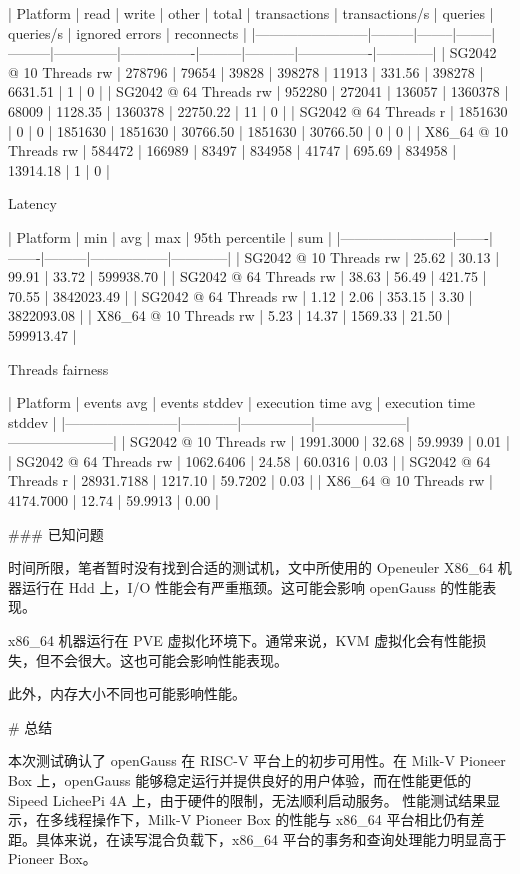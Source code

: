 \documentclass{article}
\begin{document}
\begin{markdown}
| Platform               | read    | write  | other  | total   | transactions | transactions/s | queries | queries/s | ignored errors | reconnects |
|------------------------|---------|--------|--------|---------|--------------|----------------|---------|-----------|----------------|------------|
| SG2042 @ 10 Threads rw | 278796  | 79654  | 39828  | 398278  | 11913        | 331.56         | 398278  | 6631.51   | 1              | 0          |
| SG2042 @ 64 Threads rw | 952280  | 272041 | 136057 | 1360378 | 68009        | 1128.35        | 1360378 | 22750.22  | 11             | 0          |
| SG2042 @ 64 Threads r  | 1851630 | 0      | 0      | 1851630 | 1851630      | 30766.50       | 1851630 | 30766.50  | 0              | 0          |
| X86\_64 @ 10 Threads rw | 584472  | 166989 | 83497  | 834958  | 41747        | 695.69         | 834958  | 13914.18  | 1              | 0          |

Latency

| Platform               | min   | avg   | max     | 95th percentile | sum        |
|------------------------|-------|-------|---------|-----------------|------------|
| SG2042 @ 10 Threads rw | 25.62 | 30.13 | 99.91   | 33.72           | 599938.70  |
| SG2042 @ 64 Threads rw | 38.63 | 56.49 | 421.75  | 70.55           | 3842023.49 |
| SG2042 @ 64 Threads rw | 1.12  | 2.06  | 353.15  | 3.30            | 3822093.08 |
| X86\_64 @ 10 Threads rw | 5.23  | 14.37 | 1569.33 | 21.50           | 599913.47  |


Threads fairness

| Platform               | events avg | events stddev | execution time avg | execution time stddev |
|------------------------|------------|---------------|--------------------|-----------------------|
| SG2042 @ 10 Threads rw | 1991.3000  | 32.68         | 59.9939            | 0.01                  |
| SG2042 @ 64 Threads rw | 1062.6406  | 24.58         | 60.0316            | 0.03                  |
| SG2042 @ 64 Threads r  | 28931.7188 | 1217.10       | 59.7202            | 0.03                  |
| X86\_64 @ 10 Threads rw | 4174.7000  | 12.74         | 59.9913            | 0.00                  |

### 已知问题

时间所限，笔者暂时没有找到合适的测试机，文中所使用的 Openeuler X86\_64 机器运行在 Hdd 上，I/O 性能会有严重瓶颈。这可能会影响 openGauss 的性能表现。

x86\_64 机器运行在 PVE 虚拟化环境下。通常来说，KVM 虚拟化会有性能损失，但不会很大。这也可能会影响性能表现。

此外，内存大小不同也可能影响性能。

# 总结

本次测试确认了 openGauss 在 RISC-V 平台上的初步可用性。在 Milk-V Pioneer Box 上，openGauss 能够稳定运行并提供良好的用户体验，而在性能更低的 Sipeed LicheePi 4A 上，由于硬件的限制，无法顺利启动服务。
性能测试结果显示，在多线程操作下，Milk-V Pioneer Box 的性能与 x86\_64 平台相比仍有差距。具体来说，在读写混合负载下，x86\_64 平台的事务和查询处理能力明显高于 Pioneer Box。

\end{markdown}
\end{document}
